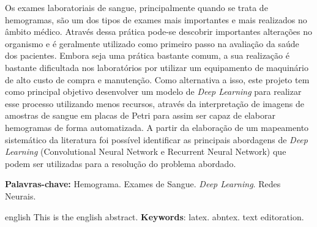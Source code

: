 \documentclass[
	10pt,			 	  %
	oneside,
	a4paper,			  %
	chapter=TITLE,		  %
	english,			 %
	brazil				 %
	]{abntex2}
\begin{document}
\setlength{\absparsep}{18pt} %
\begin{resumo}
Os exames laboratoriais de sangue, principalmente quando se trata de hemogramas, são um dos tipos de exames mais importantes e mais realizados no âmbito médico. Através dessa prática pode-se descobrir importantes alterações no organismo e é geralmente utilizado como primeiro passo na avaliação da saúde dos pacientes. Embora seja uma prática bastante comum, a sua realização é bastante dificultada nos laboratórios por utilizar um equipamento de maquinário de alto custo de compra e manutenção. Como alternativa a isso, este projeto tem como principal objetivo desenvolver um modelo de \emph{Deep Learning} para realizar esse processo utilizando menos recursos, através da interpretação de imagens de amostras de sangue em placas de Petri para assim ser capaz de elaborar hemogramas de forma automatizada. A partir da elaboração de um mapeamento sistemático da literatura foi possível identificar as principais abordagens de \emph{Deep Learning} (Convolutional Neural Network e Recurrent Neural Network) que podem ser utilizadas para a resolução do problema abordado.

\textbf{Palavras-chave:} Hemograma. Exames de Sangue. \emph{Deep Learning}. Redes Neurais.
\end{resumo}

\begin{resumo}[Abstract]
	\begin{otherlanguage*}{english}
		This is the english abstract.
		\vspace{\onelineskip}
		\noindent 
		\textbf{Keywords}: latex. abntex. text editoration.
	\end{otherlanguage*}
\end{resumo}

\listoffigures*
\cleardoublepage
\listoftables*
\cleardoublepage

\end{document}
